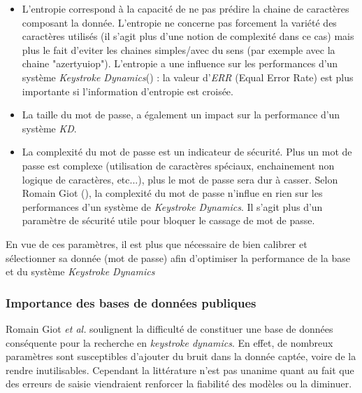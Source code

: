 \begin{itemize}
\item L'entropie correspond à la capacité de ne pas prédire la chaine de caractères composant la donnée. L'entropie ne concerne pas forcement la variété des caractères utilisés (il s'agit plus d'une notion de complexité dans ce cas) mais plus le fait d'eviter les chaines simples/avec du sens (par exemple avec la chaine "azertyuiop"). L'entropie a une influence sur les performances d'un système \textit{Keystroke Dynamics}(\cite{giotWeb}) : la valeur d'\textit{ERR} (Equal Error Rate) est plus importante si l'information d'entropie est croisée.\\

\item La taille du mot de passe, a également un impact sur la performance d'un système \textit{KD}.\\

\item La complexité du mot de passe est un indicateur de sécurité. Plus un mot de passe est complexe (utilisation de caractères spéciaux, enchainement non logique de caractères, etc...), plus le mot de passe sera dur à casser. Selon Romain Giot (\cite{giotWeb}), la complexité du mot de passe n'influe en rien sur les performances d'un système de \textit{Keystroke Dynamics}. Il s'agit plus d'un paramètre de sécurité utile pour bloquer le cassage de mot de passe.\\

\end{itemize}

En vue de ces paramètres, il est plus que nécessaire de bien calibrer et sélectionner sa donnée (mot de passe) afin d'optimiser la performance de la base et du système \textit{Keystroke Dynamics}\\

\subsubsection{Importance des bases de données publiques}

Romain Giot \textit{et al.}\cite{giotGREYC} soulignent la difficulté de constituer une base de données conséquente pour la recherche en \textit{keystroke dynamics}. En effet, de nombreux paramètres sont susceptibles d'ajouter du bruit dans la donnée captée, voire de la rendre inutilisables. Cependant la littérature n'est pas unanime quant au fait que des erreurs de saisie viendraient renforcer la fiabilité des modèles ou la diminuer.\\

